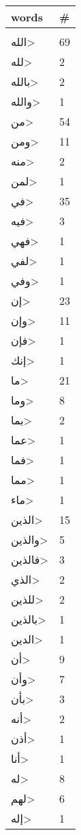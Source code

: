 \documentclass{article}
\begin{document}
\begin{multicols}{6}

\begin{center}
\begin{tabular}{ P{2cm}  P{1cm}} 
\textbf{words}    & \textbf{\#}  \\
\hline
\\[0.01cm]
\<الله> & 69 \\ 
\<لله> & 2 \\ 
\<بالله> & 2 \\ 
\<والله> & 1 \\ 
\<من> & 54 \\ 
\<ومن> & 11 \\ 
\<منه> & 2 \\ 
\<لمن> & 1 \\ 
\<في> & 35 \\ 
\<فيه> & 3 \\ 
\<فهي> & 1 \\ 
\<لفي> & 1 \\ 
\<وفي> & 1 \\ 
\<إن> & 23 \\ 
\<وإن> & 11 \\ 
\<فإن> & 1 \\ 
\<إنك> & 1 \\ 
\<ما> & 21 \\ 
\<وما> & 8 \\ 
\<بما> & 2 \\ 
\<عما> & 1 \\ 
\<فما> & 1 \\ 
\<مما> & 1 \\ 
\<ماء> & 1 \\ 
\<الذين> & 15 \\ 
\<والذين> & 5 \\ 
\<فالذين> & 3 \\ 
\<الذي> & 2 \\ 
\<للذين> & 2 \\ 
\<بالذين> & 1 \\ 
\<الدين> & 1 \\ 
\<أن> & 9 \\ 
\<وأن> & 7 \\ 
\<بأن> & 3 \\ 
\<أنه> & 2 \\ 
\<أذن> & 1 \\ 
\<أنا> & 1 \\ 
\<له> & 8 \\ 
\<لهم> & 6 \\ 
\<إله> & 1 \\ 

\end{tabular}
\end{center}
\end{multicols}
\end{document}
